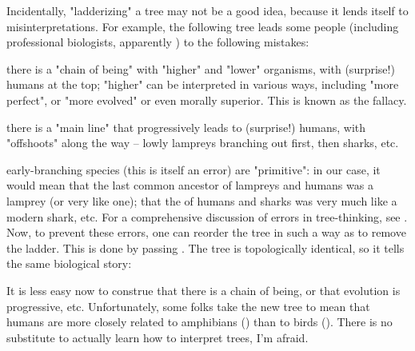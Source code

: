 Incidentally, "ladderizing" a tree may not be a good idea, because it lends
itself to misinterpretations. For example, the following tree leads some people
(including professional biologists, apparently \cite{Baum_2005}) to the
following mistakes:

\startalignment[center]
\stopalignment
\startitemize
	\item there is a "chain of being" with "higher" and "lower" organisms,
	with (surprise!) humans at the top; "higher" can be interpreted in
	various ways, including "more perfect", or "more evolved" or even
	morally superior. This is known as the  fallacy.
	\item there is a "main line" that progressively leads to (surprise!)
	humans, with "offshoots" along the way -- lowly lampreys branching out
	first, then sharks, etc. 
	\item early-branching species (this is itself an error) are
	"primitive": in our case, it would mean that the last common ancestor
	of lampreys and humans was a lamprey (or very like one); that the
	\lca{} of humans and sharks was
	very much like a modern shark, etc.
\stopitemize
For a comprehensive discussion of errors in tree-thinking, see
\cite{Gregory_2008}.  Now, to prevent these errors, one can reorder the tree in
such a way as to remove the ladder. This is done by passing . The
tree is topologically identical, so it tells the same biological story:


It is less easy now to construe that there is a chain of being, or
that evolution is progressive, etc. Unfortunately, some folks take the new tree
to mean that humans are more closely related to amphibians ()
than to birds (). There is no substitute to actually learn how
to interpret trees, I'm afraid. 
